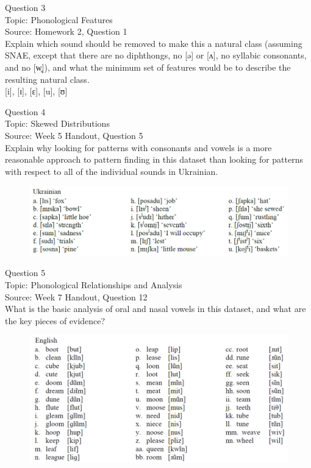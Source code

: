 \documentclass[12pt]{article}
\begin{document}
\newpage

{\large Question 3}\\

Topic: Phonological Features\\
Source: Homework 2, Question 1\\

Explain which sound should be removed to make this a natural class (assuming SNAE, except that there are no diphthongs, no [ə] or [ʌ], no syllabic consonants, and no [w̥]), and what the minimum set of features would be to describe the resulting natural class.\\

{[i]}, {[ɪ]}, {[ɛ]}, {[u]}, {[ʊ]}


\newpage

{\large Question 4}\\

Topic: Skewed Distributions\\
Source: Week 5 Handout, Question 5\\

Explain why looking for patterns with consonants and vowels is a more reasonable approach to pattern finding in this dataset than looking for patterns with respect to all of the individual sounds in Ukrainian.\\

\begin{figure}[H]
\includegraphics{../images/ukrainian.png}
\end{figure}

\newpage

{\large Question 5}\\

Topic: Phonological Relationships and Analysis\\
Source: Week 7 Handout, Question 12\\

What is the basic analysis of oral and nasal vowels in this dataset, and what are the key pieces of evidence?\\

\begin{figure}[H]
\includegraphics{../images/english12.png}
\end{figure}
\end{document}
